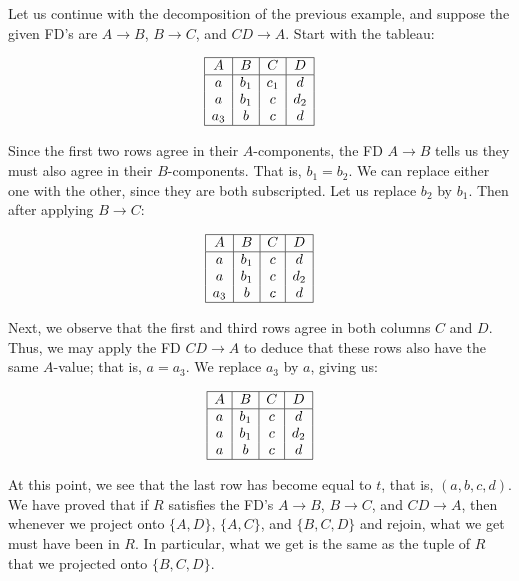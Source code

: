   \begin{example}
    \label{ex:continuing-a-relation-decomposition}
    Let us continue with the decomposition of the previous example, and suppose the given FD's are $A \rightarrow B$, $B \rightarrow C$, and $CD \rightarrow A$. Start with the tableau:

    \begin{equation}
      \begin{array}{|c|c|c|c|}
      \hline
      A & B & C & D \\
      \hline
      a & b_1 & c_1 & d \\
      a & b_1 & c & d_2 \\
      a_3 & b & c & d \\
      \hline
      \end{array}
    \end{equation}

    Since the first two rows agree in their $A$-components, the FD $A \rightarrow B$ tells us they must also agree in their $B$-components. That is, $b_1 = b_2$. We can replace either one with the other, since they are both subscripted. Let us replace $b_2$ by $b_1$. Then after applying $B \rightarrow C$:

    \begin{equation}
      \begin{array}{|c|c|c|c|}
      \hline
      A & B & C & D \\
      \hline
      a & b_1 & c & d \\
      a & b_1 & c & d_2 \\
      a_3 & b & c & d \\
      \hline
      \end{array}
    \end{equation}

    Next, we observe that the first and third rows agree in both columns $C$ and $D$. Thus, we may apply the FD $CD \rightarrow A$ to deduce that these rows also have the same $A$-value; that is, $a = a_3$. We replace $a_3$ by $a$, giving us:

    \begin{equation}
      \begin{array}{|c|c|c|c|}
      \hline
      A & B & C & D \\
      \hline
      a & b_1 & c & d \\
      a & b_1 & c & d_2 \\
      a & b & c & d \\
      \hline
      \end{array}
    \end{equation}

    At this point, we see that the last row has become equal to $t$, that is, $(a,b,c,d)$. We have proved that if $R$ satisfies the FD's $A \rightarrow B$, $B \rightarrow C$, and $CD \rightarrow A$, then whenever we project onto $\{A,D\}$, $\{A,C\}$, and $\{B,C,D\}$ and rejoin, what we get must have been in $R$. In particular, what we get is the same as the tuple of $R$ that we projected onto $\{B,C,D\}$.
  \end{example}

